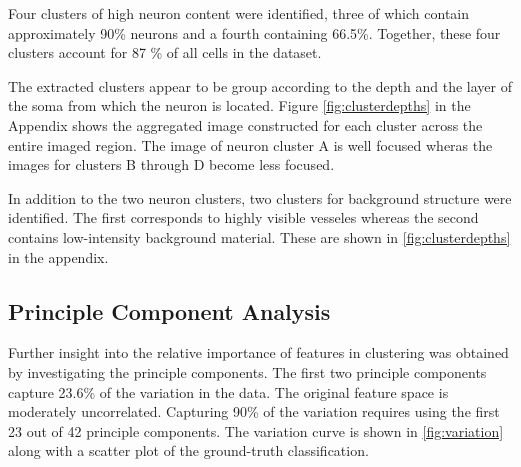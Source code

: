 \documentclass[10pt]{article}
\begin{document}
Four clusters of high neuron content were identified, three of which contain approximately \num{90}\% neurons and a fourth containing \num{66.5}\%. Together, these four clusters account for \num{87}
\% of all cells in the dataset.

The extracted clusters appear to be group according to the depth and the layer of the soma from which the neuron is located. 
Figure \cref{fig:clusterdepths} in the Appendix shows the aggregated image constructed for each cluster across the entire imaged region. 
The image of neuron cluster A is well focused wheras the images for clusters B through D become less focused. 

In addition to the two neuron clusters, two clusters for background structure were identified. The first corresponds to highly visible vesseles whereas the second contains low-intensity background material. These are shown in \cref{fig:clusterdepths} in the appendix.


\subsection{Principle Component Analysis}

Further insight into the relative importance of features in clustering was obtained by investigating the principle components.
The first two principle components capture \num{23.6}\% of the variation in the data.
The original feature space is moderately uncorrelated.
Capturing \num{90}\% of the variation requires using the first \num{23} out of \num{42} principle components.
The variation curve is shown in \cref{fig:variation} along with a scatter plot of the ground-truth classification.
\end{document}
